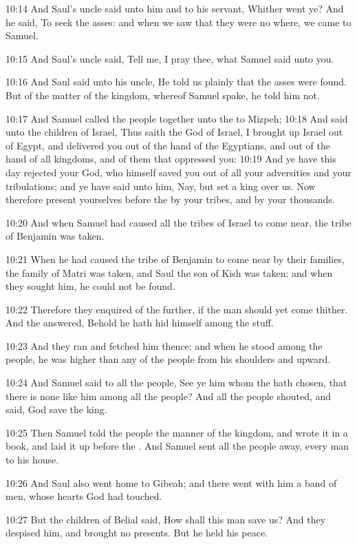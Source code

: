 10:14 And Saul's uncle said unto him and to his servant, Whither went
ye?  And he said, To seek the asses: and when we saw that they were no
where, we came to Samuel.

10:15 And Saul's uncle said, Tell me, I pray thee, what Samuel said
unto you.

10:16 And Saul said unto his uncle, He told us plainly that the asses
were found. But of the matter of the kingdom, whereof Samuel spake, he
told him not.

10:17 And Samuel called the people together unto the \LORD to Mizpeh;
10:18 And said unto the children of Israel, Thus saith the \LORD God of
Israel, I brought up Israel out of Egypt, and delivered you out of the
hand of the Egyptians, and out of the hand of all kingdoms, and of
them that oppressed you: 10:19 And ye have this day rejected your God,
who himself saved you out of all your adversities and your
tribulations; and ye have said unto him, Nay, but set a king over us.
Now therefore present yourselves before the \LORD by your tribes, and
by your thousands.

10:20 And when Samuel had caused all the tribes of Israel to come
near, the tribe of Benjamin was taken.

10:21 When he had caused the tribe of Benjamin to come near by their
families, the family of Matri was taken, and Saul the son of Kish was
taken: and when they sought him, he could not be found.

10:22 Therefore they enquired of the \LORD further, if the man should
yet come thither. And the \LORD answered, Behold he hath hid himself
among the stuff.

10:23 And they ran and fetched him thence: and when he stood among the
people, he was higher than any of the people from his shoulders and
upward.

10:24 And Samuel said to all the people, See ye him whom the \LORD hath
chosen, that there is none like him among all the people? And all the
people shouted, and said, God save the king.

10:25 Then Samuel told the people the manner of the kingdom, and wrote
it in a book, and laid it up before the \LORD. And Samuel sent all the
people away, every man to his house.

10:26 And Saul also went home to Gibeah; and there went with him a
band of men, whose hearts God had touched.

10:27 But the children of Belial said, How shall this man save us? And
they despised him, and brought no presents. But he held his peace.

